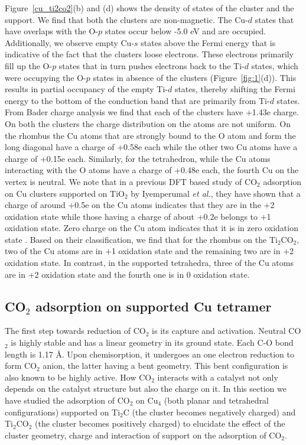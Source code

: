 Figure~\ref{cu_ti2co2}(b) and (d) shows the density of states of the cluster
and the support. We find that both the clusters are non-magnetic. The Cu-$d$
states that have overlaps with the O-$p$ states occur below -5.0 eV and are
occupied. Additionally, we observe empty Cu-$s$ states above the Fermi energy
that is indicative of the fact that the clusters loose electrons. These electrons
primarily fill up the O-$p$ states that in turn pushes electrons back to the
Ti-$d$ states, which were occupying the O-$p$ states in absence of the clusters
(Figure~\ref{fig:1}(d)). This results in partial occupancy of the empty Ti-$d$
states, thereby shifting the Fermi energy to the bottom of the conduction band that are primarily from Ti-$d$ states. From Bader charge analysis we find that
each of the clusters have +1.43e charge. On both the clusters the charge distribution on the atoms are not uniform. On the rhombus the Cu atoms that are
strongly bound to the O atom and form the long diagonal have a charge of +0.58e each while the other two Cu atoms have a charge of +0.15e each. Similarly, for the tetrahedron, while the Cu atoms interacting with the O atoms have a charge of +0.48e each, the fourth Cu on the vertex is neutral. We note that in a previous DFT based study of CO$_2$ adsorption on Cu clusters supported on TiO$_2$ by Iyemperumal \textit{et al.}, they have shown that a charge of around +0.5e
on the Cu atoms indicates that they are in the +2 oxidation state while those having a charge of about
+0.2e belongs to +1 oxidation state. Zero charge on the Cu atom indicates that it is in zero oxidation state
\cite{iyemperumal2017activation}. Based on their
classification, we find that for the rhombus on the Ti$_2$CO$_2$, two of the Cu atoms
are in +1 oxidation state and the remaining two are in +2 oxidation state. In contrast,
in the supported tetrahedra, three of the Cu atoms are in +2 oxidation state and the
fourth one is in 0 oxidation state.


\subsection{CO\texorpdfstring{$_2$}{} adsorption on supported Cu tetramer}

\noindent The first step towards reduction of CO$_2$ is its capture and activation. Neutral CO$_2$ is highly stable and has a linear geometry in its ground state. Each
C-O bond length is 1.17 \AA. Upon chemisorption, it undergoes an one electron reduction
to form CO$_2$ anion, the latter having a bent geometry. This bent configuration is also
known to be highly active. How CO$_2$ interacts with a catalyst not only depends on the 
catalyst structure but also the charge on it. In this section we have studied the 
adsorption of CO$_2$ on Cu$_4$ (both planar and tetrahedral configurations)
supported on Ti$_2$C (the cluster becomes negatively charged) and Ti$_2$CO$_2$ (the 
cluster becomes positively charged) to elucidate the effect of the cluster geometry, charge and 
interaction of support on the adsorption of CO$_2$.


